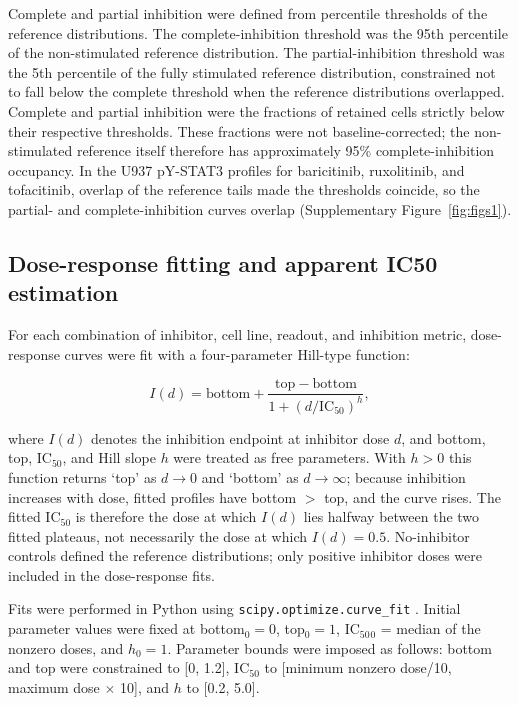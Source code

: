 \documentclass[11pt]{article}
\newcommand{\pstatthree}{pY-STAT3}
\newcommand{\icfifty}{IC$_{50}$}
\begin{document}
Complete and partial inhibition were defined from percentile thresholds of the reference distributions. The complete-inhibition threshold was the 95th percentile of the non-stimulated reference distribution. The partial-inhibition threshold was the 5th percentile of the fully stimulated reference distribution, constrained not to fall below the complete threshold when the reference distributions overlapped. Complete and partial inhibition were the fractions of retained cells strictly below their respective thresholds. These fractions were not baseline-corrected; the non-stimulated reference itself therefore has approximately 95\% complete-inhibition occupancy. In the U937 \pstatthree{} profiles for baricitinib, ruxolitinib, and tofacitinib, overlap of the reference tails made the thresholds coincide, so the partial- and complete-inhibition curves overlap (Supplementary Figure~\ref{fig:figs1}).

\subsection*{Dose-response fitting and apparent IC50 estimation}

For each combination of inhibitor, cell line, readout, and inhibition metric, dose-response curves were fit with a four-parameter Hill-type function:

\[
I(d) = \mathrm{bottom} + \frac{\mathrm{top} - \mathrm{bottom}}{1 + (d / \mathrm{IC}_{50})^h},
\]

where $I(d)$ denotes the inhibition endpoint at inhibitor dose $d$, and bottom, top, \icfifty{}, and Hill slope $h$ were treated as free parameters. With $h>0$ this function returns `top' as $d\to0$ and `bottom' as $d\to\infty$; because inhibition increases with dose, fitted profiles have bottom $>$ top, and the curve rises. The fitted \icfifty{} is therefore the dose at which $I(d)$ lies halfway between the two fitted plateaus, not necessarily the dose at which $I(d)=0.5$. No-inhibitor controls defined the reference distributions; only positive inhibitor doses were included in the dose-response fits.

Fits were performed in Python using \texttt{scipy.optimize.curve\_fit} \citep{virtanen2020scipy}. Initial parameter values were fixed at bottom$_0=0$, top$_0=1$, \icfifty{}$_0$ = median of the nonzero doses, and $h_0=1$. Parameter bounds were imposed as follows: bottom and top were constrained to [0, 1.2], \icfifty{} to [minimum nonzero dose/10, maximum dose $\times$ 10], and $h$ to [0.2, 5.0].
\end{document}
